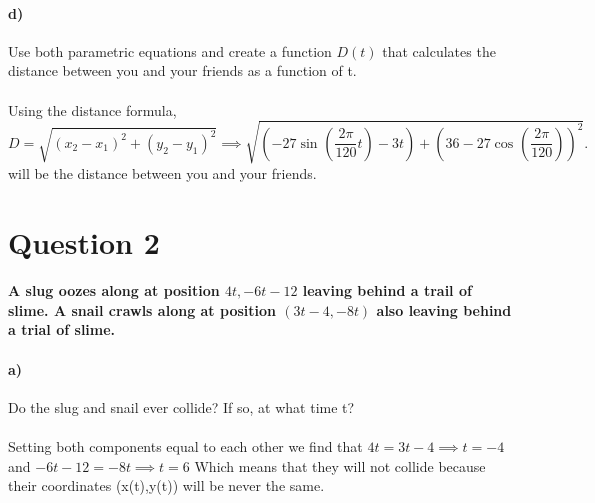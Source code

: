 \documentclass{report}
\begin{document}
\paragraph{d)} Use both parametric equations and create a function $ D\left( t \right)  $ that calculates the distance between you and your friends as a function of t. \\ \\
Using the distance formula,
\[
D= \sqrt{ \left( x_2-x_1 \right) ^2+\left( y_2-y_1 \right) ^2 } \implies \sqrt{ \left( -27\sin^{  } \left( \frac{ 2\pi }{ 120 } t \right) -3t \right) + \left( 36-27\cos^{  } \left( \frac{ 2\pi }{ 120 }  \right)  \right) ^2 } 
.\] 
will be the distance between you and your friends. 
\section*{Question 2}%
\label{sec:Question 2}
\paragraph{A slug oozes along at position $ 4t,-6t-12 $ leaving behind a trail of slime. A snail crawls along at position $ \left( 3t-4,-8t \right)  $ also leaving behind a trial of slime.
}
\paragraph{a)} Do the slug and snail ever collide? If so, at what time t? \\ \\
Setting both components equal to each other we find that $ 4t=3t-4 \implies t=-4 $ and $ -6t-12=-8t \implies t=6$ Which means that they will not collide because their coordinates (x(t),y(t)) will be never the same.
\end{document}
